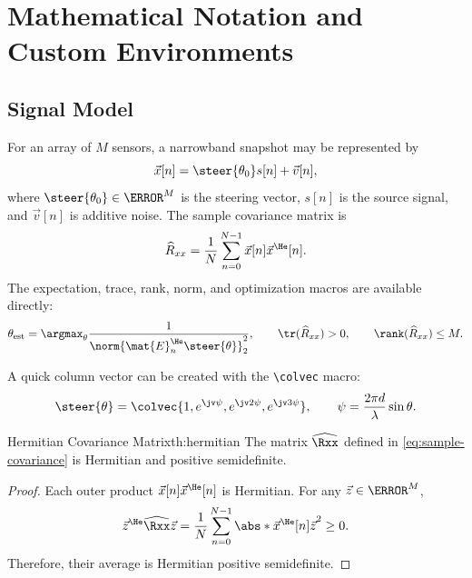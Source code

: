 \section{Mathematical Notation and Custom Environments}

\subsection{Signal Model}

For an array of $M$ sensors, a narrowband snapshot may be represented by
\begin{equation}
    \vec{x}[n] = \steer{\theta_0}s[n] + \vec{v}[n],
    \label{eq:signal-model}
\end{equation}
where $\steer{\theta_0}\in\C^M$ is the steering vector, $s[n]$ is the source signal,
and $\vec{v}[n]$ is additive noise. The sample covariance matrix is
\begin{equation}
    \widehat{R}_{xx}
    = \frac{1}{N}\sum_{n=0}^{N-1}\vec{x}[n]\vec{x}^{\He}[n].
    \label{eq:sample-covariance}
\end{equation}
The expectation, trace, rank, norm, and optimization macros are available directly:
\begin{equation}
    \theta_{\mathrm{est}}
    = \argmax_{\theta}\frac{1}{\norm{\mat{E}_{n}^{\He}\steer{\theta}}_2^2},
    \qquad
    \tr(\widehat{R}_{xx})>0,
    \qquad
    \rank(\widehat{R}_{xx})\le M.
\end{equation}

A quick column vector can be created with the \verb|\colvec| macro:
\begin{equation}
    \steer{\theta}
    = \colvec{1,e^{\jv\psi},e^{\jv2\psi},e^{\jv3\psi}},
    \qquad
    \psi = \frac{2\pi d}{\lambda}\sin\theta.
\end{equation}

\begin{theorem}{Hermitian Covariance Matrix}{th:hermitian}
The matrix $\widehat{\Rxx}$ defined in \eqref{eq:sample-covariance} is Hermitian and
positive semidefinite.
\end{theorem}

\begin{proof}
Each outer product $\vec{x}[n]\vec{x}^{\He}[n]$ is Hermitian. For any
$\vec{z}\in\C^M$,
\[
\vec{z}^{\He}\widehat{\Rxx}\vec{z}
=\frac{1}{N}\sum_{n=0}^{N-1}\abs*{\vec{x}^{\He}[n]\vec{z}}^2\ge 0.
\]
Therefore, their average is Hermitian positive semidefinite.
\end{proof}

